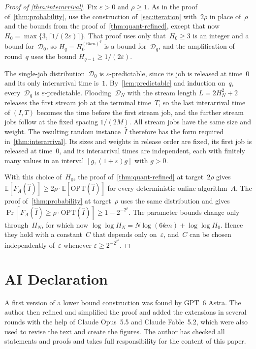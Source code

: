 \documentclass[11pt,letterpaper]{article}
\theoremstyle{definition}
\theoremstyle{remark}
\newcommand{\OPT}{{\mathrm{OPT}}}
\newcommand{\eps}{\varepsilon}
\newcommand{\E}{\mathbb{E}}
\newcommand{\cD}{\mathcal{D}}
\begin{document}
\begin{proof}[Proof of \cref{thm:interarrival}]
Fix $\eps>0$ and $\rho\ge1$. As in the proof of~\cref{thm:probability}, use the construction of~\cref{sec:iteration} with~$2\rho$ in place of~$\rho$ and the bounds from the proof of~\cref{thm:quant-refined}, except that now $H_0=\max\{3,\lceil1/(2\eps)\rceil\}$. That proof uses only that~$H_0\ge3$ is an integer and a bound for~$\cD_0$, so $H_q=H_0^{(6km)^q}$ is a bound for~$\cD_q$, and the amplification of round~$q$ uses the bound $H_{q-1}\ge1/(2\eps)$.

The single-job distribution~$\cD_0$ is $\eps$-predictable, since its job is released at time~$0$ and its only interarrival time is~$1$. By~\cref{lem:predictable} and induction on~$q$, every~$\cD_q$ is $\eps$-predictable. Flooding~$\cD_N$ with the stream length $L=2H_N^2+2$ releases the first stream job at the terminal time~$T$, so the last interarrival time of $(I,T)$ becomes the time before the first stream job, and the further stream jobs follow at the fixed spacing $1/(2M)$. All stream jobs have the same size and weight. The resulting random instance~$\hat I$ therefore has the form required in~\cref{thm:interarrival}. Its sizes and weights in release order are fixed, its first job is released at time~$0$, and its interarrival times are independent, each with finitely many values in an interval $[g,(1+\eps)g]$ with $g>0$.

With this choice of~$H_0$, the proof of~\cref{thm:quant-refined} at target~$2\rho$ gives $\E[F_A(\hat I)]\ge2\rho\cdot\E[\OPT(\hat I)]$ for every deterministic online algorithm~$A$. The proof of~\cref{thm:probability} at target~$\rho$ uses the same distribution and gives $\Pr[F_A(\hat I)\ge\rho\cdot \OPT(\hat I)]\ge1-2^{-2^\rho}$. The parameter bounds change only through~$H_N$, for which now $\log\log H_N=N\log(6km)+\log\log H_0$. Hence they hold with a constant~$C$ that depends only on~$\eps$, and~$C$ can be chosen independently of~$\eps$ whenever $\eps\ge2^{-2^{2^\rho}}$.
\end{proof}


\section*{AI Declaration}

A first version of a lower bound construction was found by GPT~6 Astra. The author then refined and simplified the proof and added the extensions in several rounds with the help of Claude Opus~5.5 and Claude Fable~5.2, which were also used to revise the text and create the figures. The author has checked all statements and proofs and takes full responsibility for the content of this paper.

\begin{refcontext}[sorting=nyt]
\printbibliography
\end{refcontext}
\end{document}
